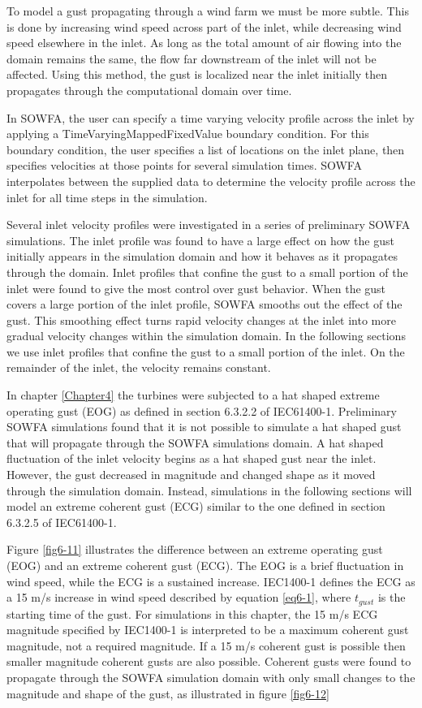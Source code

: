 To model a gust propagating through a wind farm we must be more subtle. This is done by increasing wind speed across part of the inlet, while decreasing wind speed elsewhere in the inlet. As long as the total amount of air flowing into the domain remains the same, the flow far downstream of the inlet will not be affected. Using this method, the gust is localized near the inlet initially then propagates through the computational domain over time. 

In SOWFA, the user can specify a time varying velocity profile across the inlet by applying a TimeVaryingMappedFixedValue boundary condition. For this boundary condition, the user specifies a list of locations on the inlet plane, then specifies velocities at those points for several simulation times. SOWFA interpolates between the supplied data to determine the velocity profile across the inlet for all time steps in the simulation.

Several inlet velocity profiles were investigated in a series of preliminary SOWFA simulations. The inlet profile was found to have a large effect on how the gust initially appears in the simulation domain and how it behaves as it propagates through the domain. Inlet profiles that confine the gust to a small portion of the inlet were found to give the most control over gust behavior. When the gust covers a large portion of the inlet profile, SOWFA smooths out the effect of the gust. This smoothing effect turns rapid velocity changes at the inlet into more gradual velocity changes within the simulation domain. In the following sections we use inlet profiles that confine the gust to a small portion of the inlet. On the remainder of the inlet, the velocity remains constant. 

In chapter \ref{Chapter4} the turbines were subjected to a hat shaped extreme operating gust (EOG) as defined in section 6.3.2.2 of IEC61400-1\cite{IEC2005}. Preliminary SOWFA simulations found that it is not possible to simulate a hat shaped gust that will propagate through the SOWFA simulations domain. A hat shaped fluctuation of the inlet velocity begins as a hat shaped gust near the inlet. However, the gust decreased in magnitude and changed shape as it moved through the simulation domain. Instead, simulations in the following sections will model an extreme coherent gust (ECG) similar to the one defined in section 6.3.2.5 of IEC61400-1. 

Figure \ref{fig6-11} illustrates the difference between an extreme operating gust (EOG) and an extreme coherent gust (ECG). The EOG is a brief fluctuation in wind speed, while the ECG is a sustained increase. IEC1400-1 defines the ECG as a 15 m/s increase in wind speed described by equation \ref{eq6-1}, where $t_{gust}$ is the starting time of the gust. For simulations in this chapter, the 15 m/s ECG magnitude specified by IEC1400-1 is interpreted to be a maximum coherent gust magnitude, not a required magnitude. If a 15 m/s coherent gust is possible then smaller magnitude coherent gusts are also possible. Coherent gusts were found to propagate through the SOWFA simulation domain with only small changes to the magnitude and shape of the gust, as illustrated in figure \ref{fig6-12}



